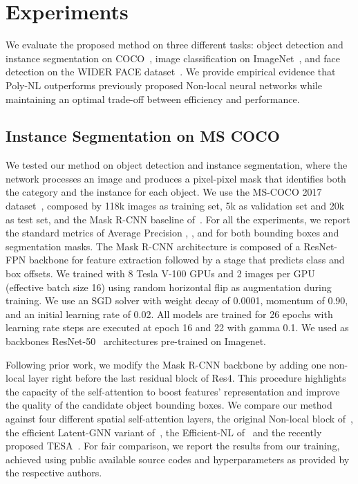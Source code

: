 \documentclass[10pt,twocolumn,letterpaper]{article}
\begin{document}
\section{Experiments}
We evaluate the proposed method on three different tasks: object detection and instance segmentation on COCO~\cite{lin2014microsoft}, image classification on ImageNet~\cite{russakovsky2015imagenet}, and face detection on the WIDER FACE dataset~\cite{yang2016wider}. We provide empirical evidence that Poly-NL outperforms previously proposed Non-local neural networks while maintaining an optimal trade-off between efficiency and performance.

\subsection{Instance Segmentation on MS COCO}
We tested our method on object detection and instance segmentation, where the network processes an image and produces a pixel-pixel mask that identifies both the category and the instance for each object. We use the MS-COCO 2017 dataset~\cite{lin2014microsoft}, composed by 118k images as training set, 5k as validation set and 20k as test set, and the Mask R-CNN baseline of~\cite{he2017mask}. For all the experiments, we report the standard metrics of Average Precision , , and  for both bounding boxes and segmentation masks. The Mask R-CNN architecture is composed of a ResNet-FPN backbone for feature extraction followed by a stage that predicts class and box offsets. We trained with 8 Tesla V-100 GPUs and 2 images per GPU (effective batch size 16) using random horizontal flip as augmentation during training. We use an SGD solver with weight decay of 0.0001, momentum of 0.90, and an initial learning rate of 0.02. All models are trained for 26 epochs with learning rate steps are executed at epoch 16 and 22 with gamma 0.1. We used as backbones ResNet-50~\cite{he2016deep} architectures pre-trained on Imagenet.

Following prior work, we modify the Mask R-CNN backbone by adding one non-local layer right before the last residual block of Res4. This procedure highlights the capacity of the self-attention to boost features' representation and improve the quality of the candidate object bounding boxes. We compare our method against four different spatial self-attention layers, the original Non-local block of~\cite{wang2018non}, the efficient Latent-GNN variant of~\cite{zhang2019latentgnn}, the Efficient-NL of~\cite{shen2021efficient} and the recently proposed TESA~\cite{babiloni2020tesa}. For fair comparison, we report the results from our training, achieved using public available source codes and hyperparameters as provided by the respective authors. 
\end{document}
